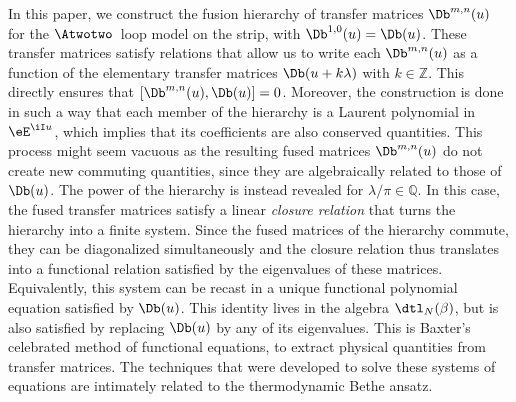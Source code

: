 \documentclass[11pt]{article}
\numberwithin{equation}{section}
\theoremstyle{alexi}
\begin{document}
In this paper, we construct the fusion hierarchy of transfer matrices $\Db^{m,n}(u)$ for the $\Atwotwo$~loop model on the strip, with $\Db^{1,0}(u) = \Db(u)$. These transfer matrices satisfy relations that allow us to write each $\Db^{m,n}(u)$ as a function of the elementary transfer matrices $\Db(u+k \lambda)$ with $k \in \mathbb Z$. This directly ensures that $[\Db^{m,n}(u),\Db(u)]=0$. Moreover, the construction is done in such a way that each member of the hierarchy is a Laurent polynomial in $\eE^{\iI u}$, which implies that its coefficients are also conserved quantities. This process might seem vacuous as the resulting fused matrices $\Db^{m,n}(u)$ do not create new commuting quantities, since they are algebraically related to those of $\Db(u)$. The power of the hierarchy is instead revealed for $\lambda/\pi \in \mathbb Q$. In this case,  the fused transfer matrices satisfy a linear {\it closure relation} that turns the hierarchy into a finite system. Since the fused matrices of the hierarchy commute, they can be diagonalized simultaneously and the closure relation thus translates into a functional relation satisfied by the eigenvalues of these matrices. Equivalently, this system can be recast in a unique functional polynomial equation satisfied by $\Db(u)$. This identity lives in the algebra $\dtl_N(\beta)$, but is also satisfied by replacing $\Db(u)$ by any of its eigenvalues. This is Baxter's celebrated method \cite{BAXTER} of functional equations, to extract physical quantities from transfer matrices. The techniques that were developed to solve these systems of equations \cite{PK91,KP91,KP92,AMDAKPP21} are intimately related to the thermodynamic Bethe ansatz.
\end{document}
